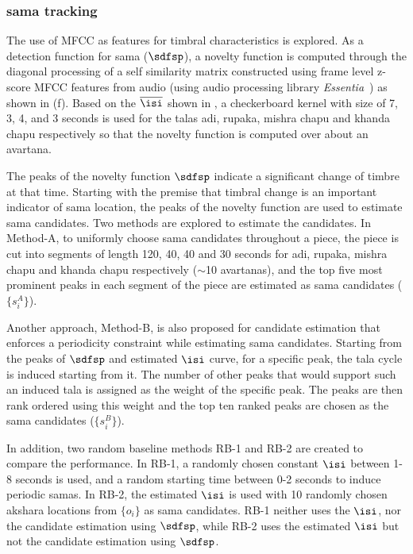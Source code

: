 \subsubsection{\Gls{sama} tracking}
The use of \gls{MFCC} as features for timbral characteristics is explored. As a detection function for \gls{sama} ($\sdfsp$), a novelty function is computed through the diagonal processing of a self similarity matrix \cite{foote:00:novelty} constructed using frame level z-score \gls{MFCC} features from audio (using audio processing library \textit{Essentia}~\cite{bogdanov:13:essentiaISMIR}) as shown in (f). Based on the $\overline{\isi}$ shown in , a checkerboard kernel with size of 7, 3, 4, and 3 seconds is used for the \glspl{tala} \gls{adi}, \gls{rupaka}, \gls{mishra chapu} and \gls{khanda chapu} respectively so that the novelty function is computed over about an \gls{avartana}. 

The peaks of the novelty function $\sdfsp$ indicate a significant change of timbre at that time. Starting with the premise that timbral change is an important indicator of \gls{sama} location, the peaks of the novelty function are used to estimate \gls{sama} candidates. Two methods are explored to estimate the candidates. In Method-A, to uniformly choose \gls{sama} candidates throughout a piece, the piece is cut into segments of length 120, 40, 40 and 30 seconds for \gls{adi}, \gls{rupaka}, \gls{mishra chapu} and \gls{khanda chapu} respectively ($\sim$10 \glspl{avartana}), and the top five most prominent peaks in each segment of the piece are estimated as \gls{sama} candidates ($\{s^A_i\}$). 

Another approach, Method-B, is also proposed for candidate estimation that enforces a periodicity constraint while estimating \gls{sama} candidates. Starting from the peaks of $\sdfsp$ and estimated $\isi$ curve, for a specific peak, the \gls{tala} cycle is induced starting from it. The number of other peaks that would support such an induced \gls{tala} is assigned as the weight of the specific peak. The peaks are then rank ordered using this weight and the top ten ranked peaks are chosen as the \gls{sama} candidates ($\{s^B_i\}$). 

In addition, two random baseline methods RB-1 and RB-2 are created to compare the performance. In RB-1, a randomly chosen constant $\isi$ between 1-8 seconds is used, and a random starting time between 0-2 seconds to induce periodic \glspl{sama}. In RB-2, the estimated $\isi$ is used with 10 randomly chosen \gls{akshara} locations from $\{o_i\}$ as \gls{sama} candidates. RB-1 neither uses the $\isi$, nor the candidate estimation using $\sdfsp$, while RB-2 uses the estimated $\isi$ but not the candidate estimation using $\sdfsp$. 

